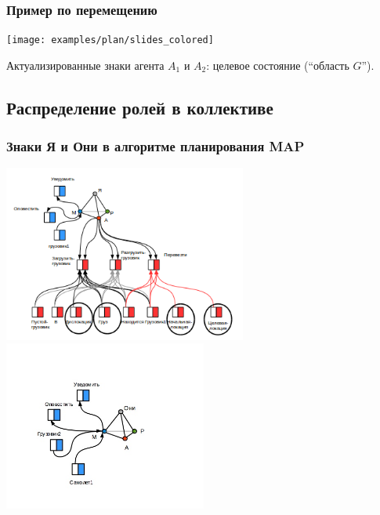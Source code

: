 \documentclass[default]{beamer}
\begin{document}
	\begin{frame}
		\frametitle{Пример по перемещению}
		
		\begin{center}
			\texttt{[image: examples/plan/slides\_colored]}
		\end{center}
		\par\bigskip
		Актуализированные знаки агента $A_1$ и $A_2$: целевое состояние (``область $G$'').
	\end{frame}
	
	\subsection{Распределение ролей в коллективе}
	\begin{frame}
		\frametitle{Знаки Я и Они в алгоритме планирования MAP}
		
		\begin{center}
			\includegraphics[width=0.6\textwidth]{I-sign.png}
			\includegraphics[width=0.5\textwidth]{they-sign.png}
		\end{center}
		\nocite{*}
		\printbibliography[keyword={roledistrib}, resetnumbers=true]
	\end{frame}
\end{document}
